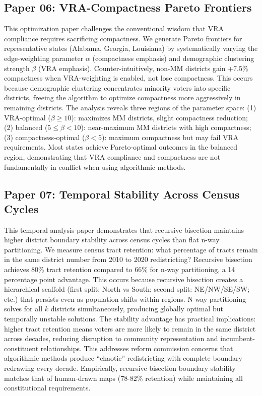 \documentclass[11pt]{article}
\begin{document}
\subsection*{Paper 06: VRA-Compactness Pareto Frontiers}

This optimization paper challenges the conventional wisdom that VRA compliance requires sacrificing compactness. We generate Pareto frontiers for representative states (Alabama, Georgia, Louisiana) by systematically varying the edge-weighting parameter $\alpha$ (compactness emphasis) and demographic clustering strength $\beta$ (VRA emphasis). Counter-intuitively, non-MM districts gain +7.5\% compactness when VRA-weighting is enabled, not lose compactness. This occurs because demographic clustering concentrates minority voters into specific districts, freeing the algorithm to optimize compactness more aggressively in remaining districts. The analysis reveals three regions of the parameter space: (1) VRA-optimal ($\beta \geq 10$): maximizes MM districts, slight compactness reduction; (2) balanced ($5 \leq \beta < 10$): near-maximum MM districts with high compactness; (3) compactness-optimal ($\beta < 5$): maximum compactness but may fail VRA requirements. Most states achieve Pareto-optimal outcomes in the balanced region, demonstrating that VRA compliance and compactness are not fundamentally in conflict when using algorithmic methods.

\subsection*{Paper 07: Temporal Stability Across Census Cycles}

This temporal analysis paper demonstrates that recursive bisection maintains higher district boundary stability across census cycles than flat n-way partitioning. We measure census tract retention: what percentage of tracts remain in the same district number from 2010 to 2020 redistricting? Recursive bisection achieves 80\% tract retention compared to 66\% for n-way partitioning, a 14 percentage point advantage. This occurs because recursive bisection creates a hierarchical scaffold (first split: North vs South; second split: NE/NW/SE/SW; etc.) that persists even as population shifts within regions. N-way partitioning solves for all $k$ districts simultaneously, producing globally optimal but temporally unstable solutions. The stability advantage has practical implications: higher tract retention means voters are more likely to remain in the same district across decades, reducing disruption to community representation and incumbent-constituent relationships. This addresses reform commission concerns that algorithmic methods produce ``chaotic'' redistricting with complete boundary redrawing every decade. Empirically, recursive bisection boundary stability matches that of human-drawn maps (78-82\% retention) while maintaining all constitutional requirements.
\end{document}
